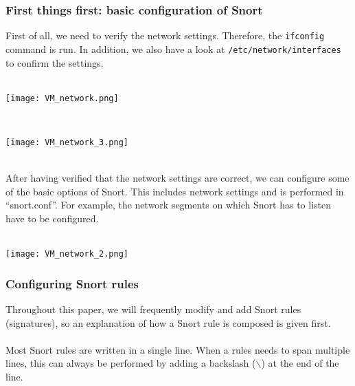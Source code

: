 \subsubsection{First things first: basic configuration of Snort}

First of all, we need to verify the network settings. Therefore, the \texttt{ifconfig} command is run. In addition, we also have a look at  \texttt{/etc/network/interfaces} to confirm the settings.
$\;$ \\ \\
\noindent\begin{minipage}{\textwidth}
    \centering
    \texttt{[image: VM\_network.png]}
\label{fig:network}
\end{minipage}
$\;$ \\ \\
\noindent\begin{minipage}{\textwidth}
    \centering
    \texttt{[image: VM\_network\_3.png]}
\label{fig:network}
\end{minipage}
$\;$ \\ \\
After having verified that the network settings are correct, we can configure some of the basic options of Snort. This includes network settings and is performed in ``snort.conf''. For example, the network segments on which Snort has to listen have to be configured.
$\;$ \\ \\
\noindent\begin{minipage}{\textwidth}
    \centering
    \texttt{[image: VM\_network\_2.png]}
\label{fig:network}
\end{minipage}

\subsubsection{Configuring Snort rules}
\label{subsec:rules}
Throughout this paper, we will frequently modify and add Snort rules (signatures), so an explanation of how a Snort rule is composed is given first. \\ \\
Most Snort rules are written in a single line. When a rules needs to span multiple lines, this can always be performed by adding a backslash ($\backslash$) at the end of the line.


